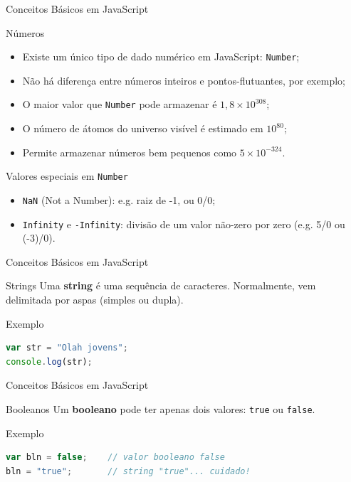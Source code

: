 \documentclass[xcolor=dvipsnames,table]{beamer}
\begin{document}
\begin{frame}[fragile]{Conceitos Básicos em JavaScript}
\begin{block}{Números}
	\begin{itemize}
		\item Existe um único tipo de dado numérico em JavaScript: {\tt Number}; \pause
		\item Não há diferença entre números inteiros e pontos-flutuantes, por exemplo; \pause 
		\item O maior valor que {\tt Number} pode armazenar é $1,8 \times 10^{308}$; \pause
		\item O número de átomos do universo visível é estimado em $10^{80}$; \pause
		\item Permite armazenar números bem pequenos como $5 \times 10^{-324}$.
	\end{itemize}	
\end{block} \pause
\begin{block}{Valores especiais em {\tt Number}}
	\begin{itemize}
		\item {\tt NaN} (Not a Number): e.g. raiz de -1, ou 0/0; \pause
		\item {\tt Infinity} e {\tt -Infinity}: divisão de um valor não-zero por zero (e.g. 5/0 ou (-3)/0).
	\end{itemize}
\end{block}
\end{frame}

\begin{frame}[fragile]{Conceitos Básicos em JavaScript}
\begin{block}{Strings}
Uma {\bf string} é uma sequência de caracteres. Normalmente, vem delimitada por aspas (simples ou dupla).
\end{block} \pause
\begin{block}{Exemplo}
\begin{lstlisting}[language=JavaScript]
var str = "Olah jovens";
console.log(str);
\end{lstlisting}	
\end{block}
\end{frame}

\begin{frame}[fragile]{Conceitos Básicos em JavaScript}
\begin{block}{Booleanos}
Um {\bf booleano} pode ter apenas dois valores: {\tt true} ou {\tt false}.
\end{block} \pause
\begin{block}{Exemplo}
\begin{lstlisting}[language=JavaScript]
var bln = false;	// valor booleano false
bln = "true";		// string "true"... cuidado!
\end{lstlisting}	
\end{block}
\end{frame}
\end{document}
